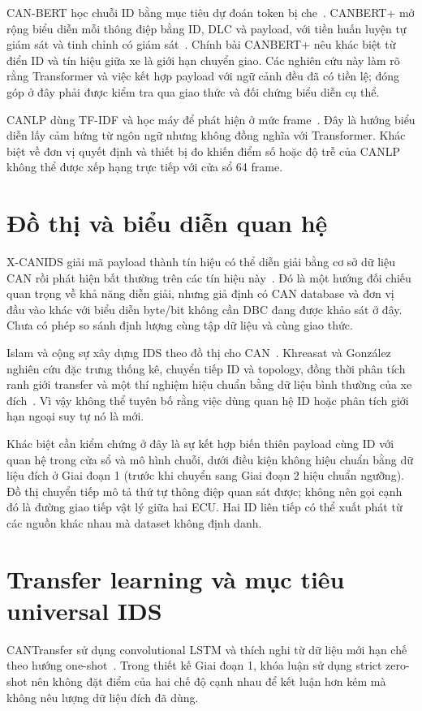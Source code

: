 \documentclass[12pt, a4paper, reqno, oneside]{book}
\begin{document}
CAN-BERT học chuỗi ID bằng mục tiêu dự đoán token bị che~\cite{alkhatib2022canbert}. CANBERT+ mở rộng biểu diễn mỗi thông điệp bằng ID, DLC và payload, với tiền huấn luyện tự giám sát và tinh chỉnh có giám sát~\cite{won2026canbertplus}. Chính bài CANBERT+ nêu khác biệt từ điển ID và tín hiệu giữa xe là giới hạn chuyển giao. Các nghiên cứu này làm rõ rằng Transformer và việc kết hợp payload với ngữ cảnh đều đã có tiền lệ; đóng góp ở đây phải được kiểm tra qua giao thức và đối chứng biểu diễn cụ thể.

CANLP dùng TF-IDF và học máy để phát hiện ở mức frame~\cite{balasubramanian2025canlp}. Đây là hướng biểu diễn lấy cảm hứng từ ngôn ngữ nhưng không đồng nghĩa với Transformer. Khác biệt về đơn vị quyết định và thiết bị đo khiến điểm số hoặc độ trễ của CANLP không thể được xếp hạng trực tiếp với cửa sổ 64 frame.

\section{Đồ thị và biểu diễn quan hệ}
X-CANIDS giải mã payload thành tín hiệu có thể diễn giải bằng cơ sở dữ liệu CAN rồi phát hiện bất thường trên các tín hiệu này~\cite{jeong2024xcanids}. Đó là một hướng đối chiếu quan trọng về khả năng diễn giải, nhưng giả định có CAN database và đơn vị đầu vào khác với biểu diễn byte/bit không cần DBC đang được khảo sát ở đây. Chưa có phép so sánh định lượng cùng tập dữ liệu và cùng giao thức.

Islam và cộng sự xây dựng IDS theo đồ thị cho CAN~\cite{islam2020graph}. Khreasat và González nghiên cứu đặc trưng thống kê, chuyển tiếp ID và topology, đồng thời phân tích ranh giới transfer và một thí nghiệm hiệu chuẩn bằng dữ liệu bình thường của xe đích~\cite{khreasat2026relational}. Vì vậy không thể tuyên bố rằng việc dùng quan hệ ID hoặc phân tích giới hạn ngoại suy tự nó là mới.

Khác biệt cần kiểm chứng ở đây là sự kết hợp biến thiên payload cùng ID với quan hệ trong cửa sổ và mô hình chuỗi, dưới điều kiện không hiệu chuẩn bằng dữ liệu đích ở Giai đoạn 1 (trước khi chuyển sang Giai đoạn 2 hiệu chuẩn ngưỡng). Đồ thị chuyển tiếp mô tả thứ tự thông điệp quan sát được; không nên gọi cạnh đó là đường giao tiếp vật lý giữa hai ECU. Hai ID liên tiếp có thể xuất phát từ các nguồn khác nhau mà dataset không định danh.

\section{Transfer learning và mục tiêu universal IDS}
CANTransfer sử dụng convolutional LSTM và thích nghi từ dữ liệu mới hạn chế theo hướng one-shot~\cite{tariq2020cantransfer}. Trong thiết kế Giai đoạn 1, khóa luận sử dụng strict zero-shot nên không đặt điểm của hai chế độ cạnh nhau để kết luận hơn kém mà không nêu lượng dữ liệu đích đã dùng.
\end{document}
